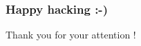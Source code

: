 \begin{frame}
  \frametitle{Happy hacking :-)}
  \vspace{8em}
  \Huge{Thank you for your attention !}
\end{frame}
